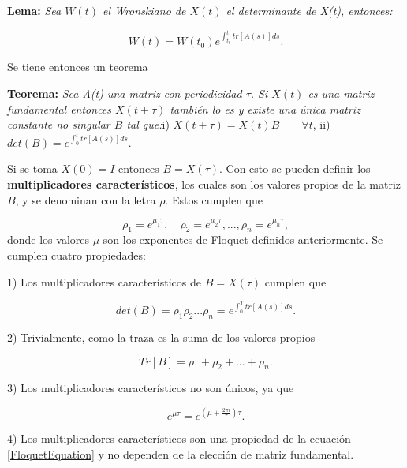 \documentclass[10pt,a4paper]{report}
\begin{document}
\begin{center}
\textbf{Lema:} \textit{Sea $W(t)$ el Wronskiano de $X(t)$ el determinante de X(t), entonces:}

\begin{equation}
W(t) = W(t_0) e^{\int_{t_0}^{t}tr[A(s)]ds}.
\end{equation}
 
\end{center} Se tiene entonces un teorema

\begin{center}
\textbf{Teorema:} \textit{Sea A(t) una matriz con periodicidad $\tau$. Si $X(t)$ es una matriz fundamental entonces $X(t+\tau)$ también lo es y existe una única matriz constante no singular $B$ tal que:}\linebreak \linebreak i) $X(t+\tau) = X(t)B \qquad\forall t$, \linebreak ii) $det(B) = e^{\int_0^t tr[A(s)]ds}.$
\end{center}Si se toma $X(0)=I$ entonces $B=X(\tau)$. Con esto se pueden definir los \textbf{multiplicadores característicos}, los cuales son los valores propios de la matriz $B$, y se denominan con la letra $\rho$. Estos cumplen que

\begin{equation}
\rho_1 = e^{\mu_1 \tau}, \quad \rho_2 = e^{\mu_2 \tau}, ... , \rho_n = e^{\mu_n \tau},
\end{equation} donde los valores $\mu$ son los exponentes de Floquet definidos anteriormente. Se cumplen cuatro propiedades:

1) Los multiplicadores característicos de $B=X(\tau)$ cumplen que

\begin{equation}
det(B) = \rho_1 \rho_2 ... \rho_n = e^{\int_0^T tr[A(s)]ds}.
\end{equation}

2) Trivialmente, como la traza es la suma de los valores propios

\begin{equation}
Tr[B] = \rho_1 + \rho_2 + ... + \rho_n.
\end{equation}

3) Los multiplicadores característicos no son únicos, ya que

\begin{equation}
e^{\mu \tau} = e^{(\mu  +\frac{2\pi i}{\tau} )\tau}.
\end{equation}

4) Los multiplicadores característicos son una propiedad de la ecuación \eqref{FloquetEquation} y no dependen de la elección de matriz fundamental.
\end{document}
